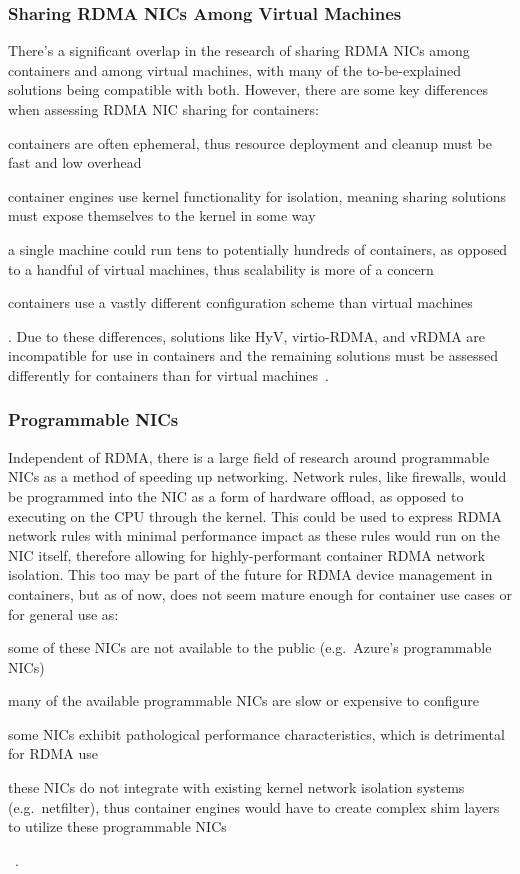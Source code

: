 \documentclass[12pt,titlepage]{article}
\begin{document}
\subsubsection{Sharing RDMA NICs Among Virtual Machines}
There's a significant overlap in the research of sharing RDMA NICs among containers and among virtual machines, with many of the to-be-explained solutions being compatible with both.
However, there are some key differences when assessing RDMA NIC sharing for containers:
\begin{enumerate*}[label={(\arabic*)},itemjoin*={{, and }},itemjoin={{, }}]
	\item containers are often ephemeral, thus resource deployment and cleanup must be fast and low overhead
	\item container engines use kernel functionality for isolation, meaning sharing solutions must expose themselves to the kernel in some way
	\item a single machine could run tens to potentially hundreds of containers, as opposed to a handful of virtual machines, thus scalability is more of a concern
	\item containers use a vastly different configuration scheme than virtual machines
\end{enumerate*}.
Due to these differences, solutions like HyV, virtio-RDMA, and vRDMA are incompatible for use in containers and the remaining solutions must be assessed differently for containers than for virtual machines~\cite{fan2017towards,hyvpaper,vrdmavmware}.

\subsubsection{Programmable NICs}
Independent of RDMA, there is a large field of research around programmable NICs as a method of speeding up networking.
Network rules, like firewalls, would be programmed into the NIC as a form of hardware offload, as opposed to executing on the CPU through the kernel.
This could be used to express RDMA network rules with minimal performance impact as these rules would run on the NIC itself, therefore allowing for highly-performant container RDMA network isolation.
This too may be part of the future for RDMA device management in containers, but as of now, does not seem mature enough for container use cases or for general use as:
\begin{enumerate*}[label={(\arabic*)},itemjoin*={{, and }},itemjoin={{, }}]
	\item some of these NICs are not available to the public (e.g.\ Azure's programmable NICs)
	\item many of the available programmable NICs are slow or expensive to configure
	\item some NICs exhibit pathological performance characteristics, which is detrimental for RDMA use
	\item these NICs do not integrate with existing kernel network isolation systems (e.g.\ netfilter), thus container engines would have to create complex shim layers to utilize these programmable NICs
\end{enumerate*}~\cite{firestone2018azure,stephens2019loom,katsikas2021you,liu2021performance,kim2020case}.
\end{document}
